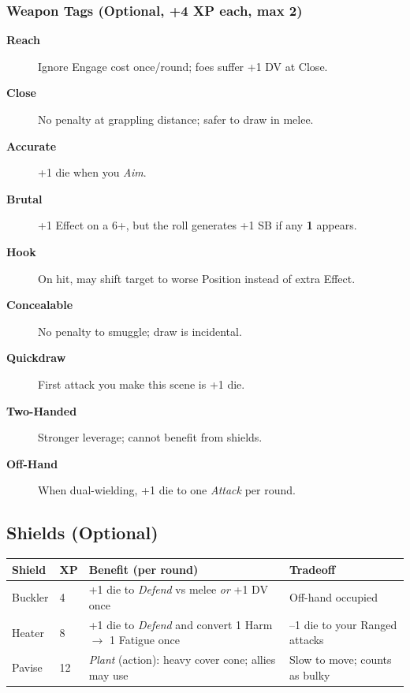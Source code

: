 \subsubsection{Weapon Tags (Optional, +4 XP each, max 2)}
\begin{description}
    \item[\textbf{Reach}] Ignore Engage cost once/round; foes suffer +1 DV at Close.
    \item[\textbf{Close}] No penalty at grappling distance; safer to draw in melee.
    \item[\textbf{Accurate}] +1 die when you \emph{Aim}.
    \item[\textbf{Brutal}] +1 Effect on a 6+, but the roll generates +1 SB if any \textbf{1} appears.
    \item[\textbf{Hook}] On hit, may shift target to worse Position instead of extra Effect.
    \item[\textbf{Concealable}] No penalty to smuggle; draw is incidental.
    \item[\textbf{Quickdraw}] First attack you make this scene is +1 die.
    \item[\textbf{Two-Handed}] Stronger leverage; cannot benefit from shields.
    \item[\textbf{Off-Hand}] When dual-wielding, +1 die to one \emph{Attack} per round.
\end{description}

\subsection{Shields (Optional)}
\begin{center}
\begin{longtable}{llll}
\toprule
\textbf{Shield} & \textbf{XP} & \textbf{Benefit (per round)} & \textbf{Tradeoff} \\
\midrule
Buckler & 4 & +1 die to \emph{Defend} vs melee \emph{or} +1 DV once & Off-hand occupied \\
Heater  & 8 & +1 die to \emph{Defend} and convert 1 Harm $\rightarrow$ 1 Fatigue once & --1 die to your Ranged attacks \\
Pavise  & 12 & \emph{Plant} (action): heavy cover cone; allies may use & Slow to move; counts as bulky \\
\bottomrule
\end{longtable}
\end{center}

